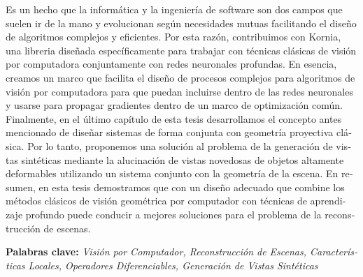 \begin{otherlanguage}{spanish}
Es un hecho que la informática y la ingeniería de software son dos campos que suelen ir de la mano y evolucionan según necesidades mutuas facilitando el diseño de algoritmos complejos y eficientes. Por esta razón, contribuimos con Kornia, una libreria diseñada específicamente para trabajar con técnicas clásicas de visión por computadora conjuntamente con redes neuronales profundas. En esencia, creamos un marco que facilita el diseño de procesos complejos para algoritmos de visión por computadora para que puedan incluirse dentro de las redes neuronales y usarse para propagar gradientes dentro de un marco de optimización común. Finalmente, en el último capítulo de esta tesis desarrollamos el concepto antes mencionado de diseñar sistemas de forma conjunta con geometría proyectiva clásica. Por lo tanto, proponemos una solución al problema de la generación de vistas sintéticas mediante la alucinación de vistas novedosas de objetos altamente deformables utilizando un sistema conjunto con la geometría de la escena. En resumen, en esta tesis demostramos que con un diseño adecuado que combine los métodos clásicos de visión geométrica por computador con técnicas de aprendizaje profundo puede conducir a mejores soluciones para el problema de la reconstrucción de escenas.

\vspace{1mm}
\textbf{Palabras clave:} \textit{Visión por Computador, Reconstrucción de Escenas, Características Locales, Operadores Diferenciables, Generación de Vistas Sintéticas}


\end{otherlanguage}



